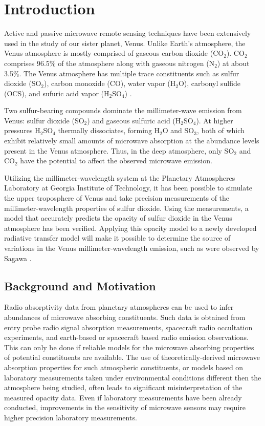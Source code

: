 \chapter{Introduction}

Active and passive microwave remote sensing techniques have been extensively used in the study of our sister planet, Venus. Unlike Earth's atmosphere, the Venus atmosphere is mostly comprised of gaseous carbon dioxide (CO$_2$). CO$_2$ comprises 96.5\% of the atmosphere along with gaseous nitrogen (N$_2$) at about 3.5\%. The Venus atmosphere has multiple trace constituents such as sulfur dioxide (SO$_2$), carbon monoxide (CO), water vapor (H$_2$O), carbonyl sulfide (OCS), and sufuric acid vapor (H$_2$SO$_4$) \cite{Suleiman-thesis}.

Two sulfur-bearing compounds dominate the millimeter-wave emission from Venus: sulfur dioxide (SO$_2$) and gaseous sulfuric acid (H$_2$SO$_4$). At higher pressures H$_2$SO$_4$ thermally dissociates, forming H$_2$O and SO$_3$, both of which exhibit relatively small amounts of microwave absorption at the abundance levels present in the Venus atmosphere. Thus, in the deep atmosphere, only SO$_2$ and CO$_2$ have the potential to affect the observed microwave emission.

Utilizing the millimeter-wavelength system at the Planetary Atmospheres Laboratory at Georgia Institute of Technology, it has been possible to simulate the upper troposphere of Venus and take precision measurements of the millimeter-wavelength properties of sulfur dioxide. Using the measurements, a model that accurately predicts the opacity of sulfur dioxide in the Venus atmosphere has been verified. Applying this opacity model to a newly developed radiative transfer model will make it possible to determine the source of variations in the Venus millimeter-wavelength emission, such as were observed by Sagawa \cite{Sagawa-2008}.

\section{Background and Motivation}

Radio absorptivity data from planetary atmospheres can be used to infer abundances of microwave absorbing constituents. Such data is obtained from entry probe radio signal absorption measurements, spacecraft radio occultation experiments, and earth-based or spacecraft based radio emission observations. This can only be done if reliable models for the microwave absorbing properties of potential constituents are available. The use of theoretically-derived microwave absorption properties for such atmospheric constituents, or models based on laboratory measurements taken under environmental conditions different then the atmosphere being studied, often leads to significant misinterpretation of the measured opacity data. Even if laboratory measurements have been already conducted, improvements in the sensitivity of microwave sensors may require higher precision laboratory measurements. 

